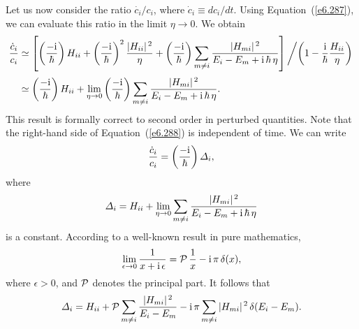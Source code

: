 Let us now consider the ratio $\dot{c_i}/c_i$, where $\dot{c}_i \equiv
d c_i/dt$. Using Equation~(\ref{e6.287}), we can evaluate this ratio in the limit
$\eta\rightarrow 0$. We obtain
\begin{align}
\frac{\dot{c}_i}{c_i} &\simeq \left[\left( \frac{-{\rm i}}{\hbar}\right) H_{ii} 
+ \left(\frac{-{\rm i}}{\hbar} \right)^2  \frac{ |H_{ii}|^{\,2} 
}{\eta}+
\left(\frac{-{\rm i}}{\hbar}\right) \sum_{m\neq i}
\frac{|H_{mi}|^{\,2} }
{E_i -E_m+{\rm i}\,\hbar \,\eta}\right]\left/\left( 1- \frac{\rm i}{\hbar}
\frac{H_{ii}}{\eta} \right)\right. \nonumber\\[0.5ex]
&\simeq \left(\frac{-{\rm i}}{\hbar}\right) H_{ii} + \lim_{\eta\rightarrow
0}\left(
\frac{-{\rm i}}{\hbar}\right) \sum_{m\neq i}
\frac{|H_{mi}|^{\,2}}{E_i - E_m+ {\rm i}\,\hbar \,\eta}.\label{e6.288}
\end{align}
This result is formally correct to second order in perturbed quantities.
Note that the right-hand side of Equation~(\ref{e6.288}) is independent of time.
We can write
\begin{equation}\label{e6.289}
\frac{\dot{c}_i}{c_i}  = \left( \frac{-{\rm i}}{\hbar}\right) 
{\mit\Delta}_i,
\end{equation}
where
\begin{equation}
{\mit\Delta}_i = H_{ii}  + \lim_{\eta\rightarrow 0}
\sum_{m\neq i} \frac{|H_{mi}|^{\,2}}{E_i - E_m+ {\rm i}\,\hbar \,\eta} 
\end{equation}
is a constant.
According to a well-known result in pure mathematics,
\begin{equation}
\lim_{\epsilon\rightarrow 0} \frac{1}{x+{\rm i}\,\epsilon}
= {\cal P}\,\frac{1}{x} - {\rm i}\,\pi\,\delta(x),
\end{equation}
where $\epsilon >0$, and ${\cal P}$ denotes the principal part. 
It follows that
\begin{equation}
{\mit\Delta}_i = H_{ii} + {\cal P}\sum_{m\neq i} \frac{|H_{mi}|^{\,2}}{E_i - E_m}
- {\rm i}\,\pi \sum_{m\neq i} |H_{mi}|^{\,2}\, \delta(E_i - E_m).
\end{equation}

